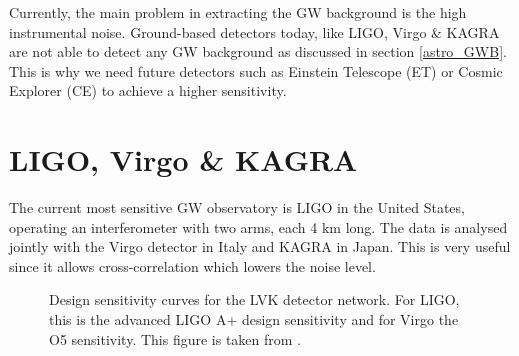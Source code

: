 Currently, the main problem in extracting the GW background is the high instrumental noise. Ground-based detectors today, like LIGO, Virgo \& KAGRA are not able to detect any GW background as discussed in section \ref{astro_GWB}. This is why we need future detectors such as Einstein Telescope (ET) or Cosmic Explorer (CE) to achieve a higher sensitivity.

\section{LIGO, Virgo \& KAGRA}

The current most sensitive GW observatory is LIGO in the United States, operating an interferometer with two arms, each 4 km long. The data is analysed jointly with the Virgo detector in Italy and KAGRA in Japan. This is very useful since it allows cross-correlation which lowers the noise level.

\begin{figure}[h]
    \centering
    \caption[Design sensitivity curves for the LVK detector network.]{Design sensitivity curves for the LVK detector network. For LIGO, this is the advanced LIGO A+ design sensitivity and for Virgo the O5 sensitivity. This figure is taken from \cite{alonso_noise_2020}.}
    \label{lvk_sensitivity}
\end{figure} 

